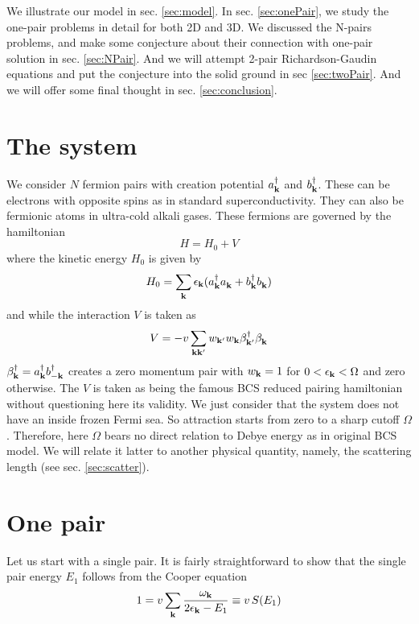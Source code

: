 \documentclass[aps,prb,showpacs,reprint]{revtex4-1}
\begin{document}
We illustrate our model in sec. \ref{sec:model}.  In sec. \ref{sec:onePair}, we study the one-pair problems in detail for both 2D and 3D.  We discussed the N-pairs problems, and make some conjecture about their connection with one-pair solution  in sec. \ref{sec:NPair}.  And we will attempt 2-pair Richardson-Gaudin equations and put the conjecture into the solid ground in sec \ref{sec:twoPair}.  And we will offer some final thought in sec. \ref{sec:conclusion}.
\section{The system\label{sec:model}}
We consider $N$ fermion pairs with creation potential $a_{\mathbf{k}}^\dagger$ and $b_{\mathbf{k}}^\dagger$. These can be electrons with opposite spins as in standard superconductivity.  They can also be fermionic atoms in ultra-cold alkali gases.  These fermions are  governed by the hamiltonian
\begin{equation}
H=H_{0}+V
\end{equation}
where  the kinetic energy $H_0$ is given by
\begin{equation}
H_0=\sum_{\mathbf{k}}\epsilon_{\mathbf{k}}(a^\dagger_{\mathbf{k}}{}a^{}_{\mathbf{k}}+b^\dagger_{\mathbf{k}}{}b^{}_{\mathbf{k}})
\label{eq:}
\end{equation}
and while the interaction $V$ is taken as 
\begin{equation}
V=-v\sum_{\mathbf{k}\mathbf{k}'}w_{\mathbf{k}'}w_{\mathbf{k}}\beta^\dagger_{\mathbf{k}'}{}\beta^{}_{\mathbf{k}}
\label{eq:VBcs}
\end{equation}
 $\beta^\dagger_{\mathbf{k}}=a^\dagger_{\mathbf{k}}b^\dagger_{-\mathbf{k}}$ creates a zero momentum pair with $w_{\mathbf{k}}=1$ for $0<\epsilon_{\mathbf{k}}<\Omega$ and zero otherwise.  The $V$ is taken as being the famous BCS reduced pairing hamiltonian without questioning here its validity.  We just consider that the system does not have an inside frozen Fermi sea. So attraction starts from zero to a sharp cutoff $\Omega$.  Therefore, here $\Omega$ bears no direct relation to Debye energy as in original BCS model. We will relate it latter to another physical quantity, namely, the scattering length (see sec. \ref{sec:scatter}). 
\section{One pair\label{sec:onePair}}
Let us start with a single pair. It is fairly straightforward to show that the single pair energy $E_1$ follows from the Cooper equation
\begin{equation}
1=v\sum_{\mathbf{k}}\frac{\omega_{\mathbf{k}}}{2\epsilon_{\mathbf{k}}-E_1}\equiv{}v\,S(E_1)
\label{eq:onePair}
\end{equation}
\end{document}
